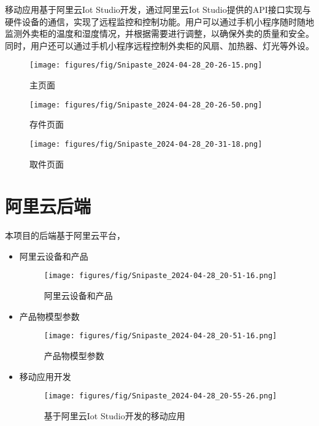 \documentclass[12pt,hyperref,a4paper,UTF8]{ctexart}
\begin{document}
移动应用基于阿里云Iot Studio开发，通过阿里云Iot Studio提供的API接口实现与硬件设备的通信，实现了远程监控和控制功能。用户可以通过手机小程序随时随地监测外卖柜的温度和湿度情况，并根据需要进行调整，以确保外卖的质量和安全。同时，用户还可以通过手机小程序远程控制外卖柜的风扇、加热器、灯光等外设。
\begin{figure}[H]
  \centering
  \begin{minipage}{.3\textwidth}
    \centering
    \texttt{[image: figures/fig/Snipaste\_2024-04-28\_20-26-15.png]}
    \caption{\small 主页面}
    \label{fig:image1}
  \end{minipage}%
  \begin{minipage}{.3\textwidth}
    \centering
    \texttt{[image: figures/fig/Snipaste\_2024-04-28\_20-26-50.png]}
    \caption{\small 存件页面}
    \label{fig:image2}
  \end{minipage}
  \begin{minipage}{.3\textwidth}
    \centering
    \texttt{[image: figures/fig/Snipaste\_2024-04-28\_20-31-18.png]}
    \caption{\small 取件页面}
    \label{fig:image3}
  \end{minipage}
\end{figure}

\newpage

\section{阿里云后端}

本项目的后端基于阿里云平台，
\begin{itemize}
  \item 阿里云设备和产品
  \begin{figure}[H]
        \centering
        \texttt{[image: figures/fig/Snipaste\_2024-04-28\_20-51-16.png]}
        \caption{阿里云设备和产品}
        \label{fig:enter-label}
  \end{figure}
  \item 产品物模型参数
    \begin{figure}[H]
        \centering
        \texttt{[image: figures/fig/Snipaste\_2024-04-28\_20-51-16.png]}
        \caption{产品物模型参数}
        \label{fig:enter-label}
  \end{figure}
  \item 移动应用开发
    \begin{figure}[H]
        \centering
        \texttt{[image: figures/fig/Snipaste\_2024-04-28\_20-55-26.png]}
        \caption{基于阿里云Iot Studio开发的移动应用}
        \label{}
  \end{figure}
\end{itemize}
\newpage
\end{document}
